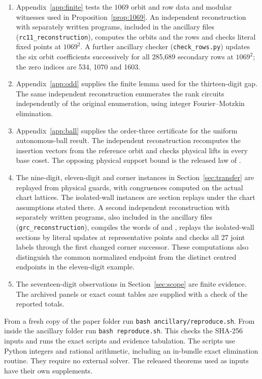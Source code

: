 \documentclass[11pt,reqno]{amsart}
\theoremstyle{definition}
\newcommand{\file}[1]{\nolinkurl{#1}}
\begin{document}
\begin{enumerate}
\item Appendix~\ref{app:finite} tests the \(1069\) orbit and row data and modular witnesses used in Proposition~\ref{prop:1069}. An independent reconstruction with separately written programs, included in the ancillary files (\file{rc11_reconstruction}), computes the orbits and the rows and checks literal fixed points at \(1069^2\). A further ancillary checker (\file{check_rows.py}) updates the six orbit coefficients successively for all 285,689 secondary rows at \(1069^2\); the zero indices are 534, 1070 and 1603.
\item Appendix~\ref{app:odd} supplies the finite lemma used for the thirteen-digit gap. The same independent reconstruction enumerates the rank circuits independently of the original enumeration, using integer Fourier--Motzkin elimination.
\item Appendix~\ref{app:ball} supplies the order-three certificate for the uniform autonomous-ball result. The independent reconstruction recomputes the insertion vectors from the reference orbit and checks physical lifts in every base coset. The opposing physical support bound is the released law of \cite[Theorem~2]{G4}.
\item The nine-digit, eleven-digit and corner instances in Section~\ref{sec:transfer} are replayed from physical guards, with congruences computed on the actual chart lattices. The isolated-wall instances are section replays under the chart assumptions stated there. A second independent reconstruction with separately written programs, also included in the ancillary files (\file{grc_reconstruction}), compiles the words of \cite{G4} and \cite{G8}, replays the isolated-wall sections by literal updates at representative points and checks all 27 joint labels through the first changed corner successor. These computations also distinguish the common normalized endpoint from the distinct centred endpoints in the eleven-digit example.
\item The seventeen-digit observations in Section~\ref{sec:scope} are finite evidence. The archived panels or exact count tables are supplied with a check of the reported totals.
\end{enumerate}

From a fresh copy of the paper folder run \texttt{bash ancillary/reproduce.sh}. From inside the ancillary folder run \texttt{bash reproduce.sh}. This checks the SHA-256 inputs and runs the exact scripts and evidence tabulation. The scripts use Python integers and rational arithmetic, including an in-bundle exact elimination routine. They require no external solver. The released theorems used as inputs have their own supplements.
\end{document}
